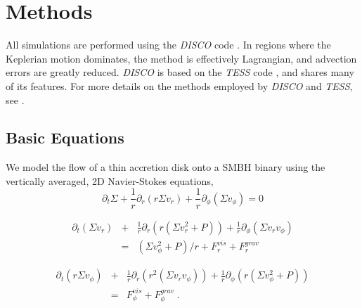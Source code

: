\documentclass[apj]{emulateapj}
\begin{document}
\section{Methods}
\label{sec:methods}
All simulations are performed using the {\it DISCO} code \citep{duffell12,duffell13}. In regions where the Keplerian motion dominates, the method is effectively Lagrangian, and advection errors are greatly reduced. {\it DISCO} is based on the {\it TESS} code \citep{duffell11}, and shares many of its features. For more details on the methods employed by {\it DISCO} and {\it TESS}, see \citet{duffell11,duffell12}.
\subsection{Basic Equations}

We model the flow of a thin accretion disk onto a SMBH binary using the vertically averaged, 2D Navier-Stokes equations,
\begin{equation}
  \partial_t \Sigma + \frac{1}{r} \partial_r \left( r \Sigma v_r \right) +  \frac{1}{r} \partial_{\phi} \left(\Sigma v_{\phi} \right)  = 0
\end{equation}

\begin{eqnarray}
  \partial_t \left( \Sigma v_r \right) &+& \frac{1}{r} \partial_r \left( r\left(\Sigma v_r^2 + P\right)\right) + \frac{1}{r} \partial_{\phi} \left( \Sigma v_r v_{\phi}\right)\nonumber\\ &=& (\Sigma v_{\phi}^2 + P)/r + F^{vis}_r + F^{grav}_r
\end{eqnarray}

\begin{eqnarray}
  \partial_t \left(r \Sigma v_{\phi}\right)&+& \frac{1}{r} \partial_r \left(r^2 (\Sigma v_r v_{\phi} ) \right) +  \frac{1}{r} \partial_{\phi} \left(r(\Sigma v_{\phi}^2 + P ) \right)\nonumber\\&=& F^{vis}_{\phi} + F^{grav}_{\phi} \ .
\end{eqnarray}
\end{document}
